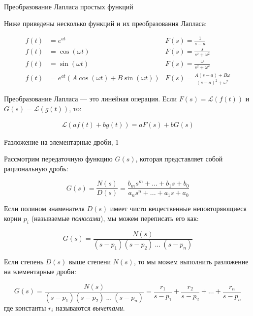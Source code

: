 \documentclass{beamer}
\begin{document}
\begin{frame}{Преобразование Лапласа простых функций}
	\begin{flushleft}
		
		Ниже приведены несколько функций и их преобразования Лапласа:
		
		\begin{align*}
			f(t) &= e^{at}  &F(s) = \frac{1}{s - a} \\
			f(t) &= \cos(\omega t) &F(s) = \frac{s}{s^2 + \omega^2} \\
			f(t) &= \sin(\omega t)  &F(s) = \frac{\omega}{s^2 + \omega^2}\\
			f(t) &= e^{at}(A \cos(\omega t) + B \sin(\omega t))  &F(s) = \frac{A (s- a) +  B\omega}{(s- a)^2 + \omega^2}
		\end{align*}
		
		Преобразование Лапласа — это линейная операция. Если $F(s) = \mathcal{L}(f(t))$ и $G(s) = \mathcal{L}(g(t))$, то:
		
		\begin{align}
			\mathcal{L}\left(a f(t) + b g(t)\right) = a F(s) + b G(s)
		\end{align}
		
		
		
	\end{flushleft}
\end{frame}



\begin{frame}{Разложение на элементарные дроби, 1}
	\begin{flushleft}
		
		Рассмотрим передаточную функцию $G(s)$, которая представляет собой рациональную дробь:
		
		\begin{equation}
			G(s) = \frac{N(s)}{D(s)} = \frac{b_m s^m + ... + b_1 s + b_0}{a_n s^n + ... + a_1 s + a_0}
		\end{equation}		
		
		Если полином знаменателя $D(s)$ имеет чисто вещественные неповторяющиеся корни $p_i$ (называемые \emph{полюсами}), мы можем переписать его как:
		
		\begin{equation}
			G(s) = \frac{N(s)}{(s - p_1)(s - p_2) \ ... \ (s - p_n)}
		\end{equation}		
		
		
		Если степень $D(s)$ выше степени $N(s)$, то мы можем выполнить разложение на элементарные дроби:
		
		\begin{equation*}
			G(s) = \frac{N(s)}{(s - p_1)(s - p_2) \ ... \ (s - p_n)} = \frac{r_1}{s - p_1} + \frac{r_2}{s - p_2} + ... + \frac{r_n}{s - p_n}
		\end{equation*}		
		где константы $r_i$ называются \emph{вычетами}.
		
	\end{flushleft}
\end{frame}
\end{document}
